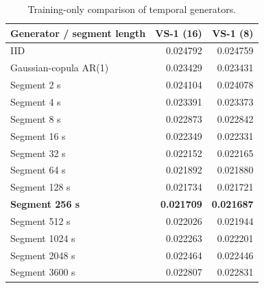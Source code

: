 \begin{table}[t]
\centering
\caption{Training-only comparison of temporal generators.}
\label{tab:fast_block_selection}
\footnotesize
\setlength{\tabcolsep}{4pt}
\renewcommand{\arraystretch}{1.08}
\begin{tabular}{@{}lrr@{}}
\toprule
Generator / segment length & VS-1 (16) & VS-1 (8) \\
\midrule
IID & 0.024792 & 0.024759 \\
Gaussian-copula AR(1) & 0.023429 & 0.023431 \\
Segment 2 s & 0.024104 & 0.024078 \\
Segment 4 s & 0.023391 & 0.023373 \\
Segment 8 s & 0.022873 & 0.022842 \\
Segment 16 s & 0.022349 & 0.022331 \\
Segment 32 s & 0.022152 & 0.022165 \\
Segment 64 s & 0.021892 & 0.021880 \\
Segment 128 s & 0.021734 & 0.021721 \\
\textbf{Segment 256 s} & \textbf{0.021709} & \textbf{0.021687} \\
Segment 512 s & 0.022026 & 0.021944 \\
Segment 1024 s & 0.022263 & 0.022201 \\
Segment 2048 s & 0.022464 & 0.022446 \\
Segment 3600 s & 0.022807 & 0.022831 \\
\bottomrule
\end{tabular}
\par\smallskip
\begin{minipage}{\columnwidth}\footnotesize
\end{minipage}
\end{table}

